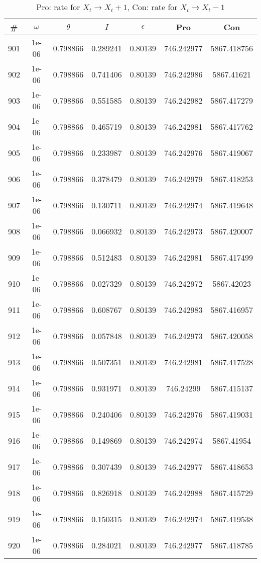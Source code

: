 \newpage
\begin{table}
\caption{Pro: rate for $X_t \rightarrow X_t + 1$, Con: rate for $X_t \rightarrow X_t - 1$}
\begin{tabular*}{\linewidth}{c|c|c|c|c|c|c}
\# & $\omega$ & $\theta$ & $I$ & $\epsilon$ & Pro & Con \\
\hline
901 & 1e-06 & 0.798866 & 0.289241 & 0.80139 & 746.242977 & 5867.418756\\
902 & 1e-06 & 0.798866 & 0.741406 & 0.80139 & 746.242986 & 5867.41621\\
903 & 1e-06 & 0.798866 & 0.551585 & 0.80139 & 746.242982 & 5867.417279\\
904 & 1e-06 & 0.798866 & 0.465719 & 0.80139 & 746.242981 & 5867.417762\\
905 & 1e-06 & 0.798866 & 0.233987 & 0.80139 & 746.242976 & 5867.419067\\
906 & 1e-06 & 0.798866 & 0.378479 & 0.80139 & 746.242979 & 5867.418253\\
907 & 1e-06 & 0.798866 & 0.130711 & 0.80139 & 746.242974 & 5867.419648\\
908 & 1e-06 & 0.798866 & 0.066932 & 0.80139 & 746.242973 & 5867.420007\\
909 & 1e-06 & 0.798866 & 0.512483 & 0.80139 & 746.242981 & 5867.417499\\
910 & 1e-06 & 0.798866 & 0.027329 & 0.80139 & 746.242972 & 5867.42023\\
911 & 1e-06 & 0.798866 & 0.608767 & 0.80139 & 746.242983 & 5867.416957\\
912 & 1e-06 & 0.798866 & 0.057848 & 0.80139 & 746.242973 & 5867.420058\\
913 & 1e-06 & 0.798866 & 0.507351 & 0.80139 & 746.242981 & 5867.417528\\
914 & 1e-06 & 0.798866 & 0.931971 & 0.80139 & 746.24299 & 5867.415137\\
915 & 1e-06 & 0.798866 & 0.240406 & 0.80139 & 746.242976 & 5867.419031\\
916 & 1e-06 & 0.798866 & 0.149869 & 0.80139 & 746.242974 & 5867.41954\\
917 & 1e-06 & 0.798866 & 0.307439 & 0.80139 & 746.242977 & 5867.418653\\
918 & 1e-06 & 0.798866 & 0.826918 & 0.80139 & 746.242988 & 5867.415729\\
919 & 1e-06 & 0.798866 & 0.150315 & 0.80139 & 746.242974 & 5867.419538\\
920 & 1e-06 & 0.798866 & 0.284021 & 0.80139 & 746.242977 & 5867.418785\\

\end{tabular*}
\end{table}
